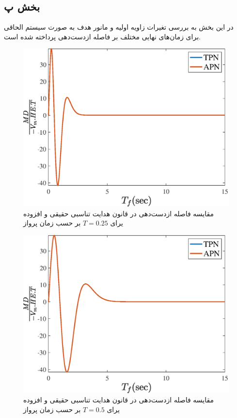 \subsection{بخش پ}
در این بخش به بررسی تغیرات زاویه اولیه و مانور هدف به صورت سیستم الحاقی برای زمان‌های نهایی مختلف بر فاصله از‌دست‌دهی پرداخته شده است.
\begin{figure}[H]
	\centering
	\includegraphics[width=.75\linewidth]{../Figure/Q2/c/HE_25}
	\caption{مقایسه فاصله ازدست‌دهی در قانون هدایت تناسبی حقیقی و افزوده یرای $T=0.25$ بر حسب زمان پرواز}
\end{figure}

\begin{figure}[H]
	\centering
	\includegraphics[width=.75\linewidth]{../Figure/Q2/c/HE_5}
	\caption{مقایسه فاصله ازدست‌دهی در قانون هدایت تناسبی حقیقی و افزوده یرای $T=0.5$ بر حسب زمان پرواز}
\end{figure}

